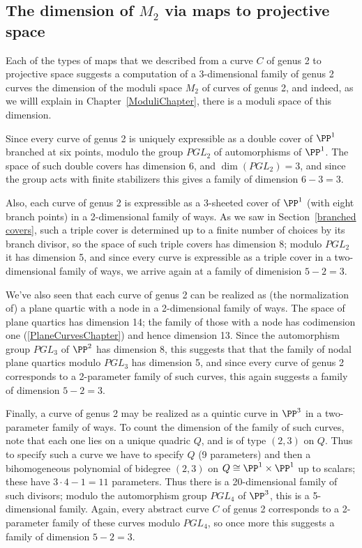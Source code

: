 \subsection{The dimension of $M_2$ via maps to projective space}

Each of the types of maps that we described from a curve $C$ of genus 2 to projective space suggests
a computation of a 3-dimensional family of genus 2 curves the dimension of the moduli space $M_2$ of curves of genus 2, and indeed, as we willl explain in Chapter~\ref{ModuliChapter}, there is a moduli space of this dimension.

Since every curve of genus 2 is uniquely expressible as a double cover of $\PP^1$ branched at six points, modulo the group $PGL_2$ of automorphisms of $\PP^1$. The space of such double covers has dimension 6, and $\dim(PGL_2) = 3$, and since the group acts with finite stabilizers this gives a family of dimension $6-3 = 3$.

Also, each curve  of genus 2 is expressible as a 3-sheeted cover of $\PP^1$ (with eight branch points) in a 2-dimensional family of ways. As we saw in Section~\ref{branched covers}, such a triple cover is determined up to a finite number of choices by its branch divisor, so the space of such triple covers has dimension 8; modulo $PGL_2$ it has dimension 5, and since every curve is expressible as a triple cover in a two-dimensional family of ways, we arrive again at a family of dimenision $ 5-2 = 3$.

We've also seen that each curve of genus 2 can be realized as (the normalization of) a plane quartic  with a node in a 2-dimensional family of ways. The space of plane quartics has dimension 14; the family of those with a node has codimension one (\ref{PlaneCurvesChapter}) and hence dimension 13. Since  the automorphism group $PGL_3$ of $\PP^2$ has dimension 8, this suggests that that the family of nodal plane quartics modulo $PGL_3$ has dimension 5, and since every curve of genus 2 corresponds to a 2-parameter family of such curves, this again suggests a family of dimension $ 5-2=3$.

Finally, a curve of genus 2 may be realized as a quintic curve in $\PP^3$ in a two-parameter family of ways. To count the dimension of the family of such curves, note that each one lies on a unique quadric $Q$, and is of type $(2,3)$ on $Q$. Thus to specify such a curve we have to specify $Q$ (9 parameters) and then a bihomogeneous polynomial of bidegree $(2,3)$ on $Q \cong \PP^1 \times \PP^1$ up to scalars; these have $3\cdot 4 - 1 = 11$ parameters. Thus there is a 20-dimensional family of such divisors; modulo the automorphism group $PGL_4$ of $\PP^3$, this is a 5-dimensional family. Again, every abstract curve $C$ of genus 2 corresponds to a 2-parameter family of these curves modulo $PGL_4$, so once more this suggests a family of dimension $ 5 - 2 = 3$.

